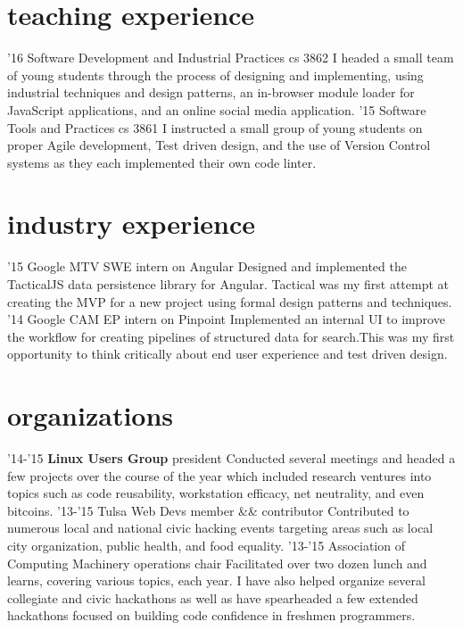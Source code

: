 \documentclass[print]{friggeri-cv}
\begin{document}
  \pagebreak

  \section{teaching experience}

    \begin{entrylist}
      \entry
        {'16}
        {Software Development and Industrial Practices}
        {cs 3862}
        {I headed a small team of young students through the process of designing and implementing, using industrial techniques and design patterns, an in-browser module loader for JavaScript applications, and an online social media application.}
      \entry
        {'15}
        {Software Tools and Practices}
        {cs 3861}
        {I instructed a small group of young students on proper Agile development, Test driven design, and the use of Version Control systems as they each implemented their own code linter.}
    \end{entrylist}

  \section{industry experience}

    \begin{entrylist}
      \entry
        {'15}
        {Google MTV}
        {SWE intern on Angular}
        {Designed and implemented the TacticalJS data persistence library for Angular. Tactical was my first attempt at creating the MVP for a new project using formal design patterns and techniques.}
      \entry
        {'14}
        {Google CAM}
        {EP intern on Pinpoint}
        {Implemented an internal UI to improve the workflow for creating pipelines of structured data for search.This was my first opportunity to think critically about end user experience and test driven design.}
    \end{entrylist}

  \section{organizations}

    \begin{entrylist}
      \entry
        {'14-'15}
        {\textbf{Linux Users Group}}
        {president}
        {Conducted several meetings and headed a few projects over the course of the year which included research ventures into topics such as code reusability, workstation efficacy, net neutrality, and even bitcoins.}
      \entry
        {'13-'15}
        {Tulsa Web Devs}
        {member \&\& contributor}
        {Contributed to numerous local and national civic hacking events targeting areas such as local city organization, public health, and food equality.}
      \entry
        {'13-'15}
        {Association of Computing Machinery}
        {operations chair}
        {Facilitated over two dozen lunch and learns, covering various topics, each year. I have also helped organize several collegiate and civic hackathons as well as have spearheaded a few extended hackathons focused on building code confidence in freshmen programmers.}
    \end{entrylist}
\end{document}
